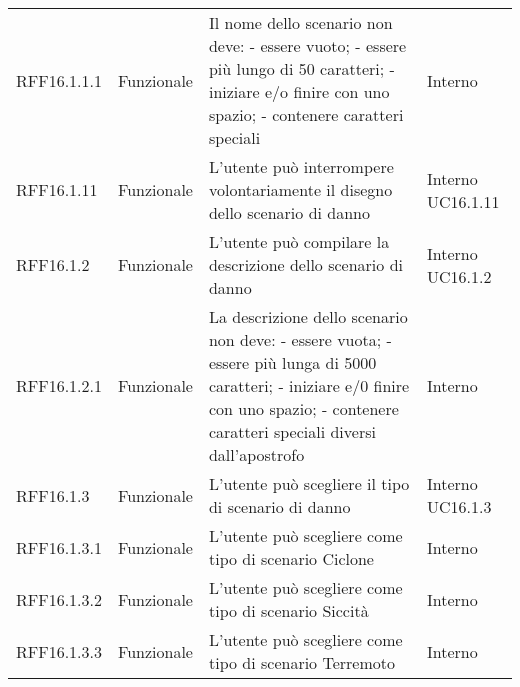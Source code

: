 \begin{longtable}{p{2cm}!{\VRule[1pt]}p{2cm}!{\VRule[1pt]}p{5cm}!{\VRule[1pt]}p{1.5cm}}
	\\
	RFF16.1.1.1 &Funzionale\newline  & Il nome dello scenario non deve:
	- essere vuoto; 
	- essere più lungo di 50 caratteri; 
	- iniziare e/o finire con uno spazio;
	- contenere caratteri speciali & Interno \\
	RFF16.1.11                       & Funzionale\newline               & L'utente può interrompere volontariamente il disegno dello scenario di danno                                             & Interno \newline UC16.1.11   
	\\
	RFF16.1.2                        & Funzionale\newline               & L'utente può compilare la descrizione dello scenario di danno                                                            & Interno \newline UC16.1.2    
	\\
	RFF16.1.2.1 &Funzionale \newline  & La descrizione dello scenario non deve:
	- essere vuota;
	- essere più lunga di 5000 caratteri;
	- iniziare e/0 finire con uno spazio; 
	- contenere caratteri speciali diversi dall'apostrofo & Interno \\
	RFF16.1.3                        & Funzionale\newline               & L'utente può scegliere il tipo di scenario di danno                                                                      & Interno \newline UC16.1.3    
	\\
	RFF16.1.3.1                      & Funzionale\newline               & L'utente può scegliere come tipo di scenario Ciclone                                                                     & Interno                      \\
	RFF16.1.3.2                      & Funzionale\newline               & L'utente può scegliere come tipo di scenario Siccità                                                                    & Interno                      \\
	RFF16.1.3.3                      & Funzionale\newline               & L'utente può scegliere come tipo di scenario Terremoto                                                                   & Interno                      \\

\end{longtable}
